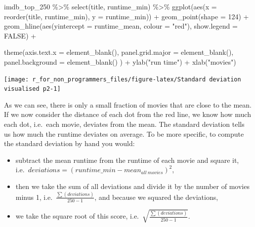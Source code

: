 \documentclass[
]{book}
\newenvironment{Shaded}{\begin{snugshade}}{\end{snugshade}}
\newcommand{\AttributeTok}[1]{\textcolor[rgb]{0.77,0.63,0.00}{#1}}
\newcommand{\ConstantTok}[1]{\textcolor[rgb]{0.00,0.00,0.00}{#1}}
\newcommand{\DecValTok}[1]{\textcolor[rgb]{0.00,0.00,0.81}{#1}}
\newcommand{\FunctionTok}[1]{\textcolor[rgb]{0.00,0.00,0.00}{#1}}
\newcommand{\NormalTok}[1]{#1}
\newcommand{\SpecialCharTok}[1]{\textcolor[rgb]{0.00,0.00,0.00}{#1}}
\newcommand{\StringTok}[1]{\textcolor[rgb]{0.31,0.60,0.02}{#1}}
\begin{document}
\begin{Shaded}
\begin{Highlighting}[]
\NormalTok{imdb\_top\_250 }\SpecialCharTok{\%\textgreater{}\%} 
  \FunctionTok{select}\NormalTok{(title, runtime\_min) }\SpecialCharTok{\%\textgreater{}\%} 
  \FunctionTok{ggplot}\NormalTok{(}\FunctionTok{aes}\NormalTok{(}\AttributeTok{x =} \FunctionTok{reorder}\NormalTok{(title, runtime\_min), }\AttributeTok{y =}\NormalTok{ runtime\_min)) }\SpecialCharTok{+}
  \FunctionTok{geom\_point}\NormalTok{(}\AttributeTok{shape =} \DecValTok{124}\NormalTok{) }\SpecialCharTok{+}
  \FunctionTok{geom\_hline}\NormalTok{(}\FunctionTok{aes}\NormalTok{(}\AttributeTok{yintercept =}\NormalTok{ runtime\_mean, }\AttributeTok{colour =} \StringTok{"red"}\NormalTok{), }\AttributeTok{show.legend =} \ConstantTok{FALSE}\NormalTok{) }\SpecialCharTok{+}
  
  \FunctionTok{theme}\NormalTok{(}\AttributeTok{axis.text.x =} \FunctionTok{element\_blank}\NormalTok{(),    }
        \AttributeTok{panel.grid.major =} \FunctionTok{element\_blank}\NormalTok{(),}
        \AttributeTok{panel.background =} \FunctionTok{element\_blank}\NormalTok{()}
\NormalTok{        ) }\SpecialCharTok{+}
  \FunctionTok{ylab}\NormalTok{(}\StringTok{"run time"}\NormalTok{) }\SpecialCharTok{+}
  \FunctionTok{xlab}\NormalTok{(}\StringTok{"movies"}\NormalTok{)}
\end{Highlighting}
\end{Shaded}

\begin{center}\texttt{[image: r\_for\_non\_programmers\_files/figure-latex/Standard deviation visualised p2-1]} \end{center}

As we can see, there is only a small fraction of movies that are close to the mean. If we now consider the distance of each dot from the red line, we know how much each dot, i.e.~each movie, deviates from the mean. The standard deviation tells us how much the runtime deviates on average. To be more specific, to compute the standard deviation by hand you would:

\begin{itemize}
\item
  subtract the mean runtime from the runtime of each movie and square it, i.e.~\(deviations = (runtime\_min - mean_{all\ movies})^2\),
\item
  then we take the sum of all deviations and divide it by the number of movies minus 1, i.e.~\(\frac{\sum(deviations)}{250-1}\), and because we squared the deviations,
\item
  we take the square root of this score, i.e.~\(\sqrt{\frac{\sum(deviations)}{250-1}}\).
\end{itemize}
\end{document}
